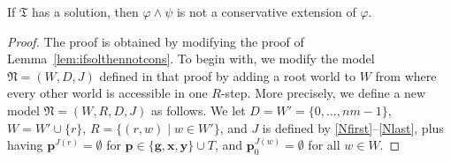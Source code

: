 \documentclass{lmcs} %
\theoremstyle{plain}\newtheorem{satz}[thm]{Satz} %
\newcommand{\tiling}{\mathfrak T}
\newcommand{\tagi}[1]{\textcolor{red}{#1}}
\newcommand{\fform}[1]{\boldsymbol{#1}}
\newcommand{\pvar}{\fform{p}}
\newcommand{\avar}{\fform{a}}
\newcommand{\gvar}{\fform{g}}
\newcommand{\xvar}{\fform{x}}
\newcommand{\yvar}{\fform{y}}
\begin{document}
	
	\begin{lem}\label{lem:ifsolthennotcons2}
		If $\tiling$ has a solution, then $\varphi \wedge \psi$ is not a 
		conservative extension of $\varphi$.
	\end{lem}
	\begin{proof}
		The proof is obtained by modifying the proof of 
		Lemma~\ref{lem:ifsolthennotcons}. 
		To begin with, we modify the model $\mathfrak{N}=(W,D,J)$ defined in that proof by 
		adding a root world to $W$ from where every other world is accessible in one $R$-step.
		More precisely, we define a new model $\mathfrak{N}=(W,R,D,J)$ as follows.
		We let $D=W'=\{0,\dots,nm-1\}$, $W=W'\cup \{r\}$, $R=\{(r,w)\mid w\in W'\}$, and $J$ is defined
		by \eqref{Nfirst}--\eqref{Nlast}, plus having $\pvar^{J(r)}=\emptyset$ for 
		$\pvar\in\{\gvar,\xvar,\yvar\}\cup T$, and $\pvar_0^{J(w)}=\emptyset$ for all $w\in W$.
		

\end{proof}
\end{document}
